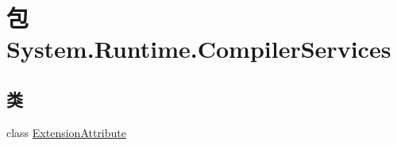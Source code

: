\hypertarget{namespace_system_1_1_runtime_1_1_compiler_services}{\section{包 System.\-Runtime.\-Compiler\-Services}
\label{namespace_system_1_1_runtime_1_1_compiler_services}
}
\subsection*{类}
\begin{DoxyCompactItemize}
\item 
class \hyperlink{class_system_1_1_runtime_1_1_compiler_services_1_1_extension_attribute}{Extension\-Attribute}
\end{DoxyCompactItemize}
